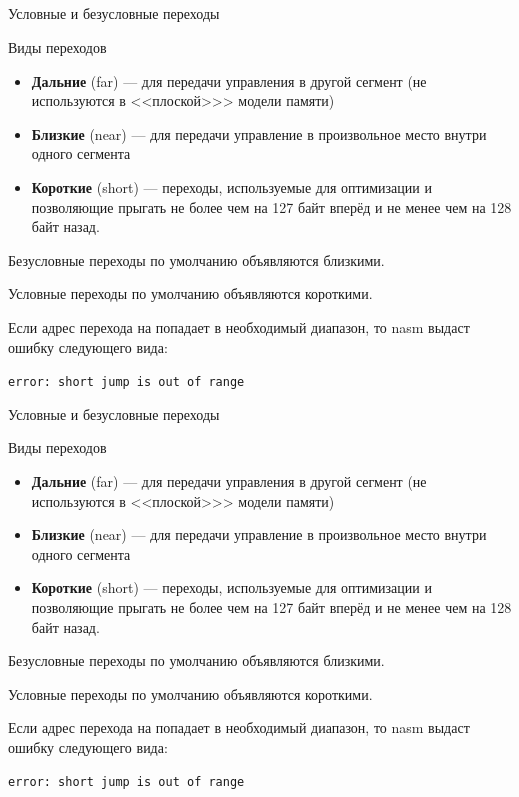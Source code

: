 \documentclass[utf8, russian]{beamer}
\begin{document}
    \subsection{}
    \begin{frame}{Условные и безусловные переходы}
        \begin{block}{Виды переходов}
            \begin{itemize}
                \item {\bf Дальние} (far) --- для передачи управления в другой сегмент (не используются в <<плоской>>> модели памяти)
                \item {\bf Близкие} (near) --- для передачи управление в произвольное место внутри одного сегмента
                \item {\bf  Короткие} (short) --- переходы, используемые для оптимизации и позволяющие прыгать не более чем на 127 байт вперёд и не менее чем на 128 байт назад.
             \end{itemize}
        \end{block}
        Безусловные переходы по умолчанию объявляются близкими.

        Условные переходы по умолчанию объявляются короткими. 

        Если адрес перехода на попадает в необходимый диапазон, то nasm выдаст ошибку следующего вида:

        {\tt error: short jump is out of range}
    \end{frame}
    \begin{frame}{Условные и безусловные переходы}
        \begin{block}{Виды переходов}
            \begin{itemize}
                \item {\bf Дальние} (far) --- для передачи управления в другой сегмент (не используются в <<плоской>>> модели памяти)
                \item {\bf Близкие} (near) --- для передачи управление в произвольное место внутри одного сегмента
                \item {\bf  Короткие} (short) --- переходы, используемые для оптимизации и позволяющие прыгать не более чем на 127 байт вперёд и не менее чем на 128 байт назад.
             \end{itemize}
        \end{block}
        Безусловные переходы по умолчанию объявляются близкими.

        Условные переходы по умолчанию объявляются короткими. 

        Если адрес перехода на попадает в необходимый диапазон, то nasm выдаст ошибку следующего вида:

        {\tt error: short jump is out of range}
    \end{frame}
\end{document}
